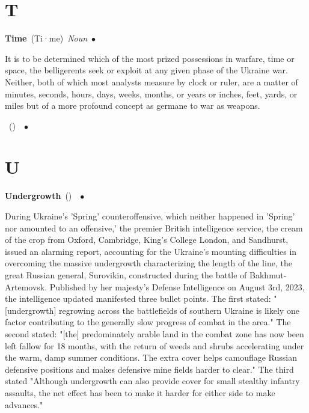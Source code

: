 \documentclass[10pt,a4paper,twoside]{article} %
\newcommand{\entry}[4]{\markboth{#1}{#1}\textbf{#1}\ {(#2)}\ \textit{#3}\ $\bullet$\ {#4}}  %
\begin{document}
\section*{T}

\begin{multicols}{2}

\entry{Time} {Ti·me} {Noun} {

It is to be determined which of the most prized possessions in warfare, time or space, the belligerents seek or exploit at any given phase of the Ukraine war. Neither, both of which most analysts measure by clock or ruler, are a matter of minutes, seconds, hours, days, weeks, months, or years or inches, feet, yards, or miles but of a more profound concept as germane to war as weapons. 

}

\entry{} {} {} {


}


\end{multicols}


\section*{U}

\begin{multicols}{2}

\entry{Undergrowth} {} {} {During Ukraine's 'Spring' counteroffensive, which neither happened in 'Spring' nor amounted to an offensive,' the premier British intelligence service, the cream of the crop from Oxford, Cambridge, King's College London, and Sandhurst, issued an alarming report, accounting for the Ukraine's mounting difficulties in overcoming the massive undergrowth characterizing the length of the line, the great Russian general, Surovikin, constructed during the battle of Bakhmut-Artemovsk. \newline \indent Published by her majesty's Defense Intelligence on August 3rd, 2023, the intelligence updated manifested three bullet points. The first stated: "[undergrowth] regrowing across the battlefields of southern Ukraine is likely one factor contributing to the generally slow progress of combat in the area." The second stated: "[the] predominately arable land in the combat zone has now been left fallow for 18 months, with the return of weeds and shrubs accelerating under the warm, damp summer conditions. The extra cover helps camouflage Russian defensive positions and makes defensive mine fields harder to clear." The third stated "Although undergrowth can also provide cover for small stealthy infantry assaults, the net effect has been to make it harder for either side to make advances." 


}


\end{multicols}
\end{document}
